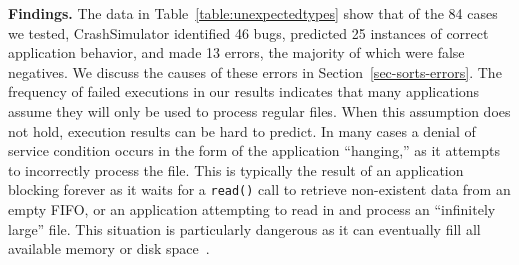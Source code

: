 {\bf Findings.}
The data in Table~\ref{table:unexpectedtypes} show that of the 84 cases we
tested, CrashSimulator identified 46 bugs,
predicted 25 instances of correct application behavior,
and made 13 errors,
the majority of which were false negatives.
We discuss the causes of these errors
in Section~\ref{sec-sorts-errors}.
The frequency of failed executions in our results
indicates that many
applications assume they will only be used to process
regular files.  When this assumption does not hold, execution results
can be hard to predict.
In many cases a denial of
service condition occurs in the form of the application ``hanging,'' as it
attempts to incorrectly process the file.
This is typically the result of
an application blocking forever as it waits for a {\tt read()}
call to retrieve non-existent data from an empty FIFO,
or an application attempting
to read in and process an
``infinitely large'' file.
This situation is particularly dangerous as
it can eventually
fill all available memory or disk space~\cite{Cappos_CCS_08}.


